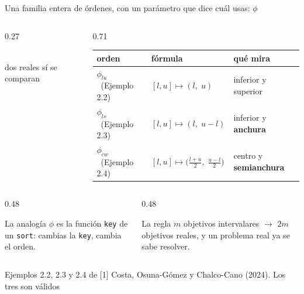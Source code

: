 \documentclass[aspectratio=169,11pt]{beamer}
\newcommand{\plu}{\textcolor{philu}{$\phi_{lu}$}}
\newcommand{\pls}{\textcolor{phils}{$\phi_{ls}$}}
\newcommand{\pcw}{\textcolor{phicw}{$\phi_{cw}$}}
\newcommand{\cita}[1]{\textcolor{gris}{\small #1}}
\newcommand{\refuno}{[1] Costa, Osuna-Gómez y Chalco-Cano (2024)}
\begin{document}
\begin{frame}{Una familia entera de órdenes, con un parámetro que dice cuál usas: $\phi$}
  \begin{columns}[c,onlytextwidth]
    \begin{column}{0.27\textwidth}
      \centering
      \\[1mm]
      {\small\color{gris} dos reales sí se comparan}
    \end{column}
    \begin{column}{0.71\textwidth}
      \footnotesize\setlength{\tabcolsep}{4pt}
      \begin{tabular}{@{}lll@{}}
        \toprule
        orden & fórmula & qué mira \\
        \midrule
        \plu\ (Ejemplo 2.2) & $[l,u]\mapsto(l,\;u)$ & inferior y superior \\
        \pls\ (Ejemplo 2.3) & $[l,u]\mapsto(l,\;u-l)$ & inferior y \textbf{anchura} \\
        \pcw\ (Ejemplo 2.4) & $[l,u]\mapsto\bigl(\tfrac{l+u}{2},\;\tfrac{u-l}{2}\bigr)$ & centro y \textbf{semianchura} \\
        \bottomrule
      \end{tabular}
    \end{column}
  \end{columns}
  \vspace{4mm}
  \begin{columns}[T]
    \begin{column}{0.48\textwidth}
      \begin{block}{La analogía}
        $\phi$ es la función \texttt{key} de un \texttt{sort}: cambias la
        \texttt{key}, cambia el orden.
      \end{block}
    \end{column}
    \begin{column}{0.48\textwidth}
      \begin{block}{La regla}
        $m$ objetivos intervalares $\to$ $2m$ objetivos reales, y un problema
        real ya se sabe resolver.
      \end{block}
    \end{column}
  \end{columns}
  \vspace{2mm}
  \cita{Ejemplos 2.2, 2.3 y 2.4 de \refuno. Los tres son válidos}
  \NotaIII
\end{frame}
\end{document}
